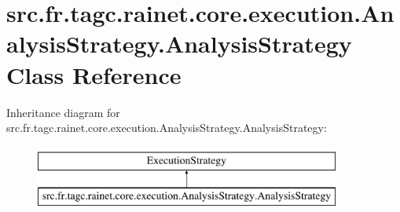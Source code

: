 \hypertarget{classsrc_1_1fr_1_1tagc_1_1rainet_1_1core_1_1execution_1_1AnalysisStrategy_1_1AnalysisStrategy}{\section{src.\-fr.\-tagc.\-rainet.\-core.\-execution.\-Analysis\-Strategy.\-Analysis\-Strategy Class Reference}
\label{classsrc_1_1fr_1_1tagc_1_1rainet_1_1core_1_1execution_1_1AnalysisStrategy_1_1AnalysisStrategy}
}
Inheritance diagram for src.\-fr.\-tagc.\-rainet.\-core.\-execution.\-Analysis\-Strategy.\-Analysis\-Strategy\-:\begin{figure}[H]
\begin{center}
\leavevmode
\includegraphics[height=2.000000cm]{classsrc_1_1fr_1_1tagc_1_1rainet_1_1core_1_1execution_1_1AnalysisStrategy_1_1AnalysisStrategy}
\end{center}
\end{figure}
